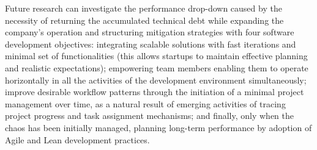\documentclass[10pt,journal,letterpaper,compsoc]{IEEEtran}
\begin{document}
Future research can investigate the performance drop-down caused by the
necessity of returning the accumulated technical debt while expanding the
company's operation and structuring mitigation strategies with four software
development objectives: integrating scalable solutions with fast iterations and
minimal set of functionalities (this allows startups to maintain effective
planning and realistic expectations); empowering team members enabling them to
operate horizontally in all the activities of the development environment
simultaneously; improve desirable workflow patterns through the initiation of a
minimal project management over time, as a natural result of emerging activities
of tracing project progress and task assignment mechanisms; and finally, only
when the chaos has been initially managed, planning long-term performance by
adoption of Agile and Lean development practices.



\end{document}
